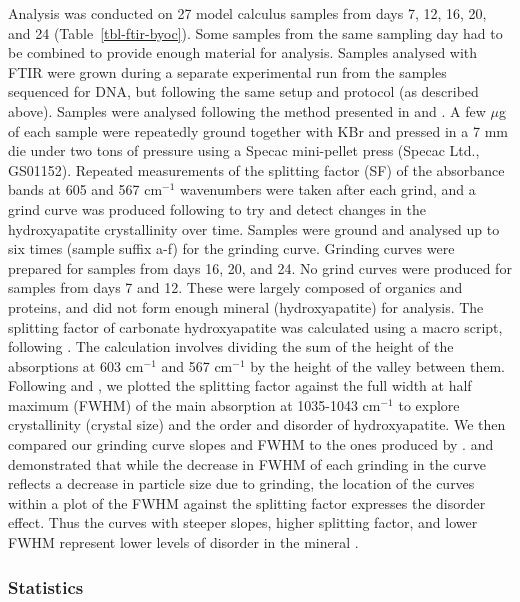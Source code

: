 \documentclass[10pt,a4paper]{article}
\begin{document}
Analysis was conducted on 27 model calculus samples from days 7, 12, 16,
20, and 24 (Table~\ref{tbl-ftir-byoc}). Some samples from the same
sampling day had to be combined to provide enough material for analysis.
Samples analysed with FTIR were grown during a separate experimental run
from the samples sequenced for DNA, but following the same setup and
protocol (as described above). Samples were analysed following the
method presented in \citep{asscherAtomicDisorder2011} and
\citep{asscherVariationsAtomic2011}. A few \(\mu\)g of each sample were
repeatedly ground together with KBr and pressed in a 7 mm die under two
tons of pressure using a Specac mini-pellet press (Specac Ltd.,
GS01152). Repeated measurements of the splitting factor (SF) of the
absorbance bands at 605 and 567 cm\(^{-1}\) wavenumbers were taken after each
grind, and a grind curve was produced following
\citep{asscherAtomicDisorder2011} to try and detect changes in the
hydroxyapatite crystallinity over time. Samples were ground and analysed
up to six times (sample suffix a-f) for the grinding curve. Grinding
curves were prepared for samples from days 16, 20, and 24. No grind
curves were produced for samples from days 7 and 12. These were largely
composed of organics and proteins, and did not form enough mineral
(hydroxyapatite) for analysis. The splitting factor of carbonate
hydroxyapatite was calculated using a macro script, following
\citep{weinerStatesPreservation1990}. The calculation involves dividing
the sum of the height of the absorptions at 603 cm\(^{-1}\) and 567
cm\(^{-1}\) by the height of the valley between them. Following
\citep{asscherAtomicDisorder2011} and
\citep{asscherVariationsAtomic2011}, we plotted the splitting factor
against the full width at half maximum (FWHM) of the main absorption at
1035-1043 cm\(^{-1}\) to explore crystallinity (crystal size) and the
order and disorder of hydroxyapatite. We then compared our grinding
curve slopes and FWHM to the ones produced by
\citep{asscherVariationsAtomic2011}. \citep{asscherVariationsAtomic2011}
and \citep{asscherAtomicDisorder2011} demonstrated that while the
decrease in FWHM of each grinding in the curve reflects a decrease in
particle size due to grinding, the location of the curves within a plot
of the FWHM against the splitting factor expresses the disorder effect.
Thus the curves with steeper slopes, higher splitting factor, and lower
FWHM represent lower levels of disorder in the mineral \citep[Figure 2
in][]{asscherVariationsAtomic2011}.

\subsubsection*{Statistics}\label{statistics}
\end{document}
